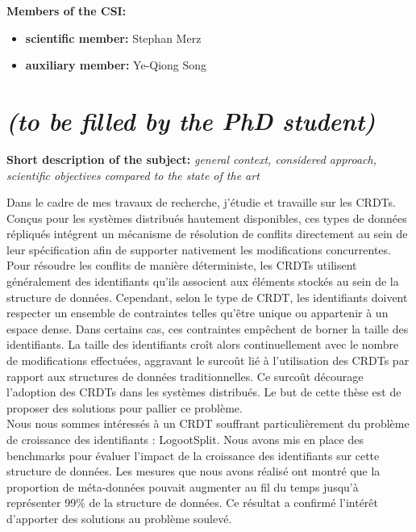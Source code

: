 \documentclass[12pt]{article}
\newcommand{\commentaire}[1]{\small\textit{#1}}
\begin{document}
\noindent\textbf{Members of the CSI:}
\begin{itemize}
\item\textbf{scientific member:}
  Stephan Merz
\item\textbf{auxiliary member:}
  Ye-Qiong Song
\end{itemize}

\newpage
\section*{ \textit{\small (to be filled by the PhD student)}}

\noindent\textbf{Short description of the subject:}
\commentaire{%
  general context, considered approach, scientific objectives
  compared to the state of the art\\}

Dans le cadre de mes travaux de recherche, j'étudie et travaille sur les \acfp{CRDT}.
Conçus pour les systèmes distribués hautement disponibles, ces types de données répliqués intégrent un mécanisme de résolution de conflits directement au sein de leur spécification afin de supporter nativement les modifications concurrentes.
Pour résoudre les conflits de manière déterministe, les \acp{CRDT} utilisent généralement des identifiants qu'ils associent aux éléments stockés au sein de la structure de données.
Cependant, selon le type de \ac{CRDT}, les identifiants doivent respecter un ensemble de contraintes telles qu'être unique ou appartenir à un espace dense.
Dans certains cas, ces contraintes empêchent de borner la taille des identifiants.
La taille des identifiants croît alors continuellement avec le nombre de modifications effectuées, aggravant le surcoût lié à l'utilisation des \acp{CRDT} par rapport aux structures de données traditionnelles.
Ce surcoût décourage l'adoption des \acp{CRDT} dans les systèmes distribués.
Le but de cette thèse est de proposer des solutions pour pallier ce problème.
\\

Nous nous sommes intéressés à un \ac{CRDT} souffrant particulièrement du problème de croissance des identifiants : LogootSplit.
Nous avons mis en place des benchmarks pour évaluer l'impact de la croissance des identifiants sur cette structure de données.
Les mesures que nous avons réalisé ont montré que la proportion de méta-données pouvait augmenter au fil du temps jusqu'à représenter 99\% de la structure de données.
Ce résultat a confirmé l'intérêt d'apporter des solutions au problème soulevé.
\\
\end{document}
